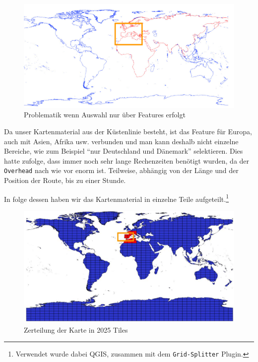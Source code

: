 \documentclass[letterpaper]{article}
\begin{document}
	\begin{figure}[!htbp]
		\centering
		\includegraphics[width=\linewidth]{select_features_problem}
		\caption{Problematik wenn Auswahl nur über Features erfolgt}
		\label{fig:select_features_problem}
	\end{figure}

	Da unser Kartenmaterial aus der Küstenlinie besteht, ist das Feature für Europa, auch mit Asien, Afrika usw. verbunden und man kann deshalb nicht einzelne Bereiche, wie zum Beispiel "`nur Deutschland und Dänemark"' selektieren. Dies hatte zufolge, dass immer noch sehr lange Rechenzeiten benötigt wurden, da der \texttt{Overhead} nach wie vor enorm ist. Teilweise, abhängig von der Länge und der Position der Route, bis zu einer Stunde.

	In folge dessen haben wir das Kartenmaterial in einzelne Teile aufgeteilt.\footnote{Verwendet wurde dabei QGIS\cite{qgis}, zusammen mit dem \texttt{Grid-Splitter} Plugin.}

	\begin{figure}[!htb]
		\centering
		\includegraphics[width=\linewidth]{grid_splitter}
		\caption{Zerteilung der Karte in 2025 Tiles}
		\label{fig:grid_splitter}
	\end{figure}
\end{document}
